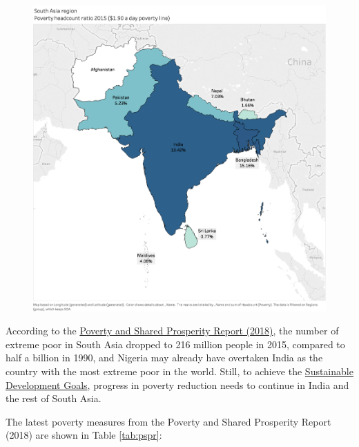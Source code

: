 \documentclass[13 pt,]{book}
\begin{document}
\begin{figure}[htbp]
\centering
\includegraphics{figures/nice_map.png}
\caption{}
\end{figure}

According to the
\href{http://www.worldbank.org/en/publication/poverty-and-shared-prosperity}{Poverty
and Shared Prosperity Report (2018)}, the number of extreme poor in
South Asia dropped to 216 million people in 2015, compared to half a
billion in 1990, and Nigeria may already have overtaken India as the
country with the most extreme poor in the world. Still, to achieve the
\href{https://www.un.org/sustainabledevelopment/poverty/}{Sustainable
Development Goals}, progress in poverty reduction needs to continue in
India and the rest of South Asia.

The latest poverty measures from the Poverty and Shared Prosperity
Report (2018) are shown in Table \ref{tab:pspr}:
\end{document}

